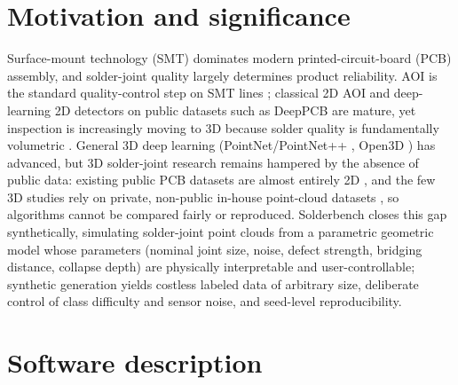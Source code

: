 \documentclass[3p]{elsarticle}
\begin{document}
\section{Motivation and significance}
Surface-mount technology (SMT) dominates modern printed-circuit-board (PCB) assembly, and solder-joint quality largely determines product reliability. AOI is the standard quality-control step on SMT lines \cite{ref1,ref2,ref3}; classical 2D AOI and deep-learning 2D detectors \cite{ref4} on public datasets such as DeepPCB \cite{ref5} are mature, yet inspection is increasingly moving to 3D because solder quality is fundamentally volumetric \cite{ref6,ref7}. General 3D deep learning (PointNet/PointNet++ \cite{ref8,ref9}, Open3D \cite{ref10}) has advanced, but 3D solder-joint research remains hampered by the absence of public data: existing public PCB datasets are almost entirely 2D \cite{ref5}, and the few 3D studies rely on private, non-public in-house point-cloud datasets \cite{ref6,ref7}, so algorithms cannot be compared fairly or reproduced. Solderbench closes this gap synthetically, simulating solder-joint point clouds from a parametric geometric model whose parameters (nominal joint size, noise, defect strength, bridging distance, collapse depth) are physically interpretable and user-controllable; synthetic generation yields costless labeled data of arbitrary size, deliberate control of class difficulty and sensor noise, and seed-level reproducibility.
\section{Software description}
\end{document}

